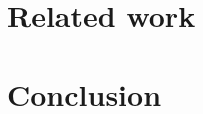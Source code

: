 \documentclass[sigconf]{acmart}
\begin{document}

\section{Related work} \label{sec:relatedWork}

\section{Conclusion} \label{sec:conclusion}





\end{document}
